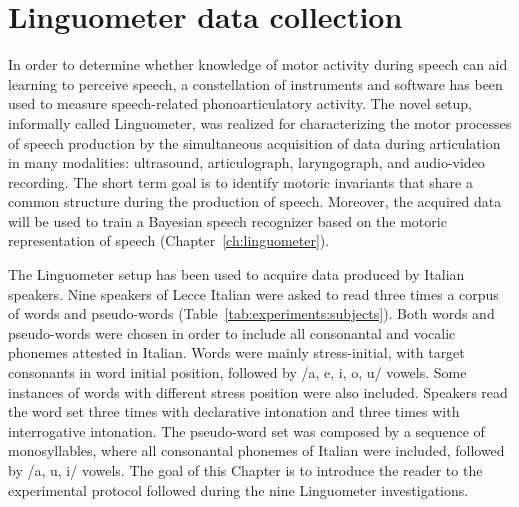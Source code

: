 \section{Linguometer data collection}
\label{ch:experiments}
In order to determine whether knowledge of motor activity during speech
can aid learning to perceive speech, a constellation of instruments and
software has been used to measure speech-related phonoarticulatory activity.
The novel setup, informally called Linguometer, was realized for characterizing 
the motor processes of speech production by the simultaneous acquisition of data
during articulation in many modalities: ultrasound, articulograph,
laryngograph, and audio-video recording. 
The short term goal is to identify motoric invariants that share a common 
structure during the production of speech.
Moreover, the acquired data will be used to train a Bayesian speech recognizer
based on the motoric representation of speech (Chapter~\ref{ch:linguometer}).


The Linguometer setup has been used to acquire data produced by Italian
speakers. 
Nine speakers of Lecce Italian were asked to read three times a corpus of words
and pseudo-words (Table~\ref{tab:experiments:subjects}).
Both words and pseudo-words were chosen in order to include all consonantal and
vocalic phonemes attested in Italian. 
Words were mainly stress-initial, with target consonants in word initial 
position, followed by /a, e, i, o, u/ vowels. 
Some instances of words with different stress position were also included.
Speakers read the word set three times with declarative intonation and three 
times with interrogative intonation. 
The pseudo-word set was composed by a sequence of monosyllables, where all 
consonantal phonemes of Italian were included, followed by /a, u, i/ vowels. 
The goal of this Chapter is to introduce the reader to the experimental protocol
followed during the nine Linguometer investigations.
